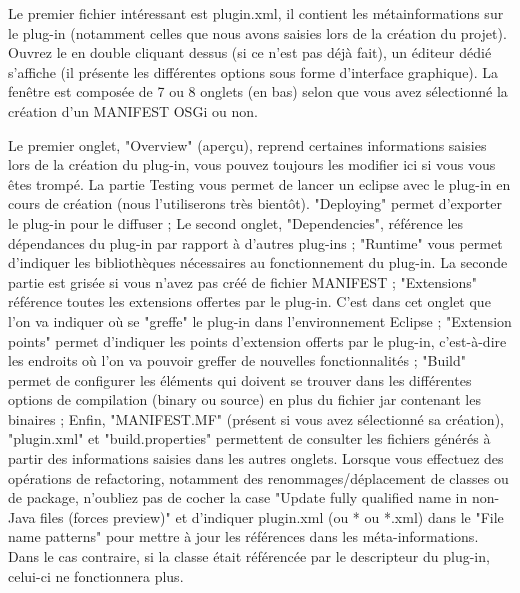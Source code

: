 Le premier fichier intéressant est plugin.xml, il contient les métainformations sur le plug-in (notamment celles que nous avons saisies lors de la création du projet). Ouvrez le en double cliquant dessus (si ce n'est pas déjà fait), un éditeur dédié s'affiche (il présente les différentes options sous forme d'interface graphique). La fenêtre est composée de 7 ou 8 onglets (en bas) selon que vous avez sélectionné la création d'un MANIFEST OSGi ou non. 

Le premier onglet, "Overview" (aperçu), reprend certaines informations saisies lors de la création du plug-in, vous pouvez toujours les modifier ici si vous vous êtes trompé. La partie Testing vous permet de lancer un eclipse avec le plug-in en cours de création (nous l'utiliserons très bientôt). "Deploying" permet d'exporter le plug-in pour le diffuser ;
Le second onglet, "Dependencies", référence les dépendances du plug-in par rapport à d'autres plug-ins ;
"Runtime" vous permet d'indiquer les bibliothèques nécessaires au fonctionnement du plug-in. La seconde partie est grisée si vous n'avez pas créé de fichier MANIFEST ;
"Extensions" référence toutes les extensions offertes par le plug-in. C'est dans cet onglet que l'on va indiquer où se "greffe" le plug-in dans l'environnement Eclipse ;
"Extension points" permet d'indiquer les points d'extension offerts par le plug-in, c'est-à-dire les endroits où l'on va pouvoir greffer de nouvelles fonctionnalités ;
"Build" permet de configurer les éléments qui doivent se trouver dans les différentes options de compilation (binary ou source) en plus du fichier jar contenant les binaires ;
Enfin, "MANIFEST.MF" (présent si vous avez sélectionné sa création), "plugin.xml" et "build.properties" permettent de consulter les fichiers générés à partir des informations saisies dans les autres onglets.	 Lorsque vous effectuez des opérations de refactoring, notamment des renommages/déplacement de classes ou de package, n'oubliez pas de cocher la case "Update fully qualified name in non-Java files (forces preview)" et d'indiquer plugin.xml (ou * ou *.xml) dans le "File name patterns" pour mettre à jour les références dans les méta-informations. Dans le cas contraire, si la classe était référencée par le descripteur du plug-in, celui-ci ne fonctionnera plus.